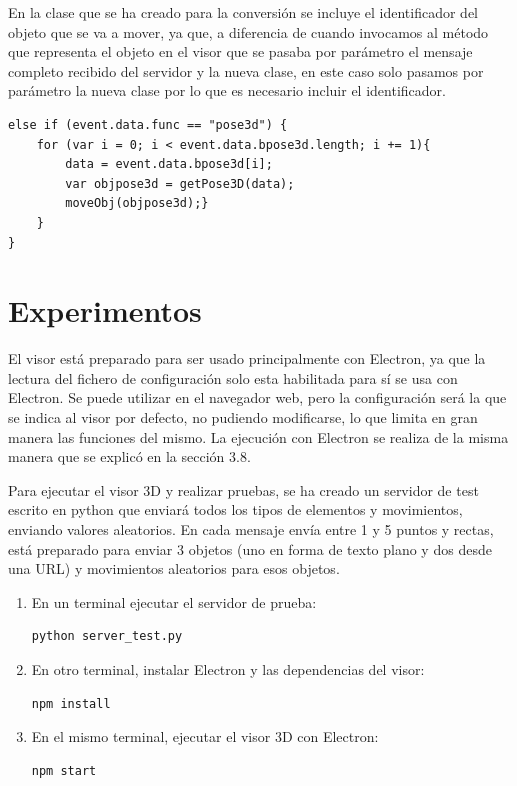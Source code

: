 En la clase que se ha creado para la conversión se incluye el identificador del objeto que se va a mover, ya que, a diferencia de cuando invocamos al método que representa el objeto en el visor que se pasaba por parámetro el mensaje completo recibido del servidor y la nueva clase, en este caso solo pasamos por parámetro la nueva clase por lo que es necesario incluir el identificador.

\begin{lstlisting}[caption= Código para tratar los mensajes con los movimientos de los objetos 3D, label=cod.tratarmovimiento]
else if (event.data.func == "pose3d") {
	for (var i = 0; i < event.data.bpose3d.length; i += 1){
		data = event.data.bpose3d[i];
		var objpose3d = getPose3D(data);
		moveObj(objpose3d);}
	}
}
\end{lstlisting}

\section{Experimentos}
El visor está preparado para ser usado principalmente con Electron, ya que la lectura del fichero de configuración solo esta habilitada para sí se usa con Electron. Se puede utilizar en el navegador web, pero la configuración será la que se indica al visor por defecto, no pudiendo modificarse, lo que limita en gran manera las funciones del mismo. La ejecución con Electron se realiza de la misma manera que se explicó en la sección 3.8.

Para ejecutar el visor 3D y realizar pruebas, se ha creado un servidor de test escrito en python que enviará todos los tipos de elementos y movimientos, enviando valores aleatorios. En cada mensaje envía entre 1 y 5 puntos y rectas, está preparado para enviar 3 objetos (uno en forma de texto plano y dos desde una URL) y movimientos aleatorios para esos objetos.

\begin{enumerate}
\item En un terminal ejecutar el servidor de prueba:
\begin{lstlisting}[caption= Ejecutar servidor de prueba, label=cod.testserver]
python server_test.py
\end{lstlisting}
\item En otro terminal, instalar Electron y las dependencias del visor:
\begin{lstlisting}[caption= Instalar Electron y sus dependencias, label=cod.instalarelectron]
npm install
\end{lstlisting}
\item En el mismo terminal, ejecutar el visor 3D con Electron:
\begin{lstlisting}[caption= Ejecutar el visor 3D mediante Electron, label=cod.tratarobjetos]
npm start
\end{lstlisting}
\end{enumerate}

